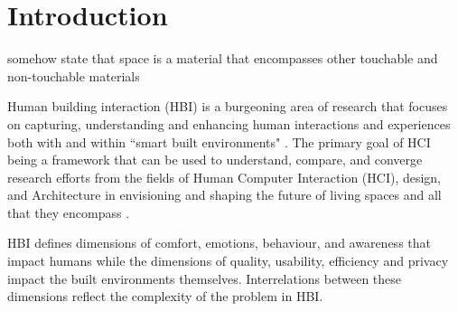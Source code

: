 \documentclass[acmconf, anonymous, review]{acmart}
\begin{document}



\maketitle

\section{Introduction}

{\color{red}somehow state that space is a material that encompasses other touchable and non-touchable materials}

Human building interaction (HBI) is a burgeoning area of research that focuses on capturing, understanding and enhancing human interactions and experiences both with and within ``smart built environments" \cite{alavi2016future}. The primary goal of HCI being a framework that can be used to understand, compare, and converge research efforts from the fields of Human Computer Interaction (HCI), design, and Architecture in envisioning and shaping the future of living spaces and all that they encompass \cite{nembrini2017human, alavi2018artifacts}. 

HBI defines dimensions of comfort, emotions, behaviour, and awareness that impact humans while the dimensions of quality, usability, efficiency and privacy impact the built environments themselves. Interrelations between these dimensions reflect the complexity of the problem in HBI.
\end{document}
